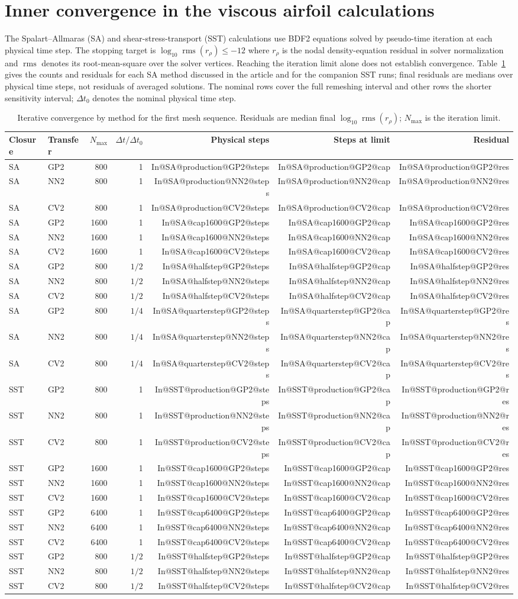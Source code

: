\documentclass[11pt,a4paper]{article}
\makeatletter
\newcommand{\Inner}[4]{\csname In@#1@#2@#3@#4\endcsname}
\newcommand{\InnerDetailRow}[5]{#1 & #3 & #4 & #5 & \Inner{#1}{#2}{#3}{steps} & \Inner{#1}{#2}{#3}{cap} & \Inner{#1}{#2}{#3}{res}\\}
\makeatother
\begin{document}
\section{Inner convergence in the viscous airfoil calculations}
The Spalart--Allmaras (SA) and shear-stress-transport (SST) calculations use BDF2 equations solved by pseudo-time iteration at each physical time step. The stopping target is $\log_{10}\operatorname{rms}(r_\rho)\leq-12$ where $r_\rho$ is the nodal density-equation residual in solver normalization and $\operatorname{rms}$ denotes its root-mean-square over the solver vertices. Reaching the iteration limit alone does not establish convergence. Table~\ref{tab:inner-supp} gives the counts and residuals for each SA method discussed in the article and for the companion SST runs; final residuals are medians over physical time steps, not residuals of averaged solutions. The nominal rows cover the full remeshing interval and other rows the shorter sensitivity interval; $\Delta t_0$ denotes the nominal physical time step.

\begin{table}[!htbp]
\centering\footnotesize
\caption{Iterative convergence by method for the first mesh sequence. Residuals are median final $\log_{10}\operatorname{rms}(r_\rho)$; $N_{\max}$ is the iteration limit.}
\label{tab:inner-supp}
\renewcommand{\arraystretch}{0.9}
\begin{tabular}{llrrrrr}
\toprule
Closure & Transfer & $N_{\max}$ & $\Delta t/\Delta t_0$ & Physical steps & Steps at limit & Residual\\
\midrule
\InnerDetailRow{SA}{production}{GP2}{800}{1}
\InnerDetailRow{SA}{production}{NN2}{800}{1}
\InnerDetailRow{SA}{production}{CV2}{800}{1}
\InnerDetailRow{SA}{cap1600}{GP2}{1600}{1}
\InnerDetailRow{SA}{cap1600}{NN2}{1600}{1}
\InnerDetailRow{SA}{cap1600}{CV2}{1600}{1}
\InnerDetailRow{SA}{halfstep}{GP2}{800}{$1/2$}
\InnerDetailRow{SA}{halfstep}{NN2}{800}{$1/2$}
\InnerDetailRow{SA}{halfstep}{CV2}{800}{$1/2$}
\InnerDetailRow{SA}{quarterstep}{GP2}{800}{$1/4$}
\InnerDetailRow{SA}{quarterstep}{NN2}{800}{$1/4$}
\InnerDetailRow{SA}{quarterstep}{CV2}{800}{$1/4$}
\InnerDetailRow{SST}{production}{GP2}{800}{1}
\InnerDetailRow{SST}{production}{NN2}{800}{1}
\InnerDetailRow{SST}{production}{CV2}{800}{1}
\InnerDetailRow{SST}{cap1600}{GP2}{1600}{1}
\InnerDetailRow{SST}{cap1600}{NN2}{1600}{1}
\InnerDetailRow{SST}{cap1600}{CV2}{1600}{1}
\InnerDetailRow{SST}{cap6400}{GP2}{6400}{1}
\InnerDetailRow{SST}{cap6400}{NN2}{6400}{1}
\InnerDetailRow{SST}{cap6400}{CV2}{6400}{1}
\InnerDetailRow{SST}{halfstep}{GP2}{800}{$1/2$}
\InnerDetailRow{SST}{halfstep}{NN2}{800}{$1/2$}
\InnerDetailRow{SST}{halfstep}{CV2}{800}{$1/2$}
\bottomrule
\end{tabular}
\end{table}
\end{document}
